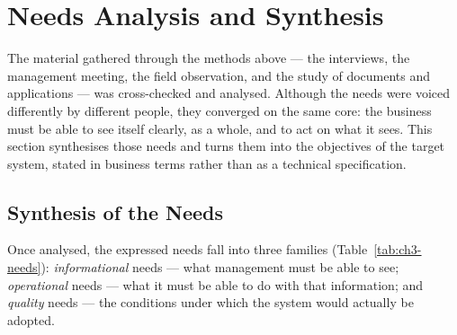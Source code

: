 \section{Needs Analysis and Synthesis}
\label{sec:ch3-objectives}

The material gathered through the methods above --- the interviews, the management meeting, the field
observation, and the study of documents and applications --- was cross-checked and analysed. Although
the needs were voiced differently by different people, they converged on the same core: the business
must be able to see itself clearly, as a whole, and to act on what it sees. This section synthesises
those needs and turns them into the objectives of the target system, stated in business terms rather
than as a technical specification.

\subsection{Synthesis of the Needs}

Once analysed, the expressed needs fall into three families (Table~\ref{tab:ch3-needs}):
\emph{informational} needs --- what management must be able to see; \emph{operational} needs --- what
it must be able to do with that information; and \emph{quality} needs --- the conditions under which
the system would actually be adopted.

